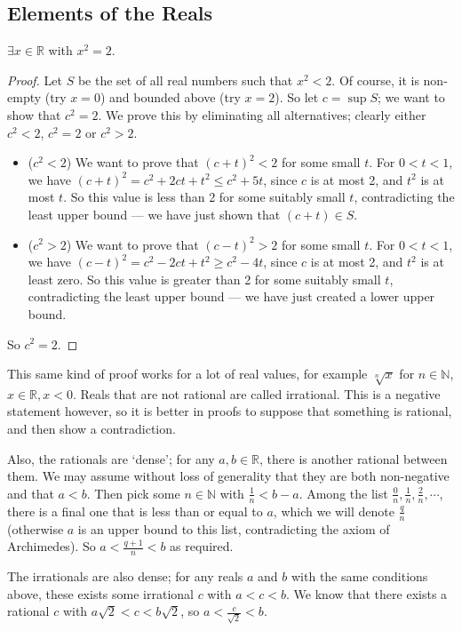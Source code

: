 \documentclass{article}
\begin{document}
\subsection{Elements of the Reals}
\begin{theorem}
	$\exists x \in \mathbb R$ with $x^2 = 2$.
\end{theorem}
\begin{proof}
	Let $S$ be the set of all real numbers such that $x^2 < 2$. Of course, it is non-empty (try $x=0$) and bounded above (try $x=2$). So let $c = \sup S$; we want to show that $c^2 = 2$. We prove this by eliminating all alternatives; clearly either $c^2 < 2$, $c^2 = 2$ or $c^2 > 2$.
	\begin{itemize}
		\item ($c^2 < 2$) We want to prove that $(c+t)^2 < 2$ for some small $t$. For $0<t<1$, we have $(c+t)^2 = c^2 + 2ct + t^2 \leq c^2 + 5t$, since $c$ is at most 2, and $t^2$ is at most $t$. So this value is less than 2 for some suitably small $t$, contradicting the least upper bound --- we have just shown that $(c+t) \in S$.
		\item ($c^2 > 2$) We want to prove that $(c-t)^2 > 2$ for some small $t$. For $0<t<1$, we have $(c-t)^2 = c^2 - 2ct + t^2 \geq c^2 - 4t$, since $c$ is at most 2, and $t^2$ is at least zero. So this value is greater than 2 for some suitably small $t$, contradicting the least upper bound --- we have just created a lower upper bound.
	\end{itemize}
	So $c^2 = 2$.
\end{proof}
This same kind of proof works for a lot of real values, for example $\sqrt[n]{x}$ for $n \in \mathbb N$, $x\in \mathbb R, x < 0$. Reals that are not rational are called irrational. This is a negative statement however, so it is better in proofs to suppose that something is rational, and then show a contradiction.

Also, the rationals are `dense'; for any $a, b \in \mathbb R$, there is another rational between them. We may assume without loss of generality that they are both non-negative and that $a<b$. Then pick some $n \in \mathbb N$ with $\frac{1}{n} < b-a$. Among the list $\frac{0}{n}, \frac{1}{n}, \frac{2}{n}, \cdots$, there is a final one that is less than or equal to $a$, which we will denote $\frac{q}{n}$ (otherwise $a$ is an upper bound to this list, contradicting the axiom of Archimedes). So $a < \frac{q + 1}{n} < b$ as required.

The irrationals are also dense; for any reals $a$ and $b$ with the same conditions above, these exists some irrational $c$ with $a<c<b$. We know that there exists a rational $c$ with $a\sqrt{2} < c < b\sqrt{2}$, so $a < \frac{c}{\sqrt{2}} < b$.
\end{document}
